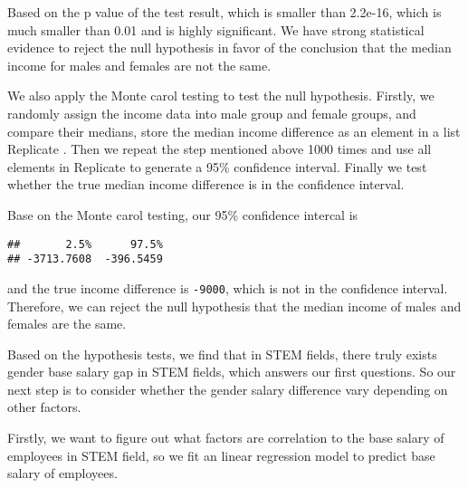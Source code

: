 \documentclass[
]{article}
\begin{document}
Based on the p value of the test result, which is smaller than 2.2e-16,
which is much smaller than 0.01 and is highly significant. We have
strong statistical evidence to reject the null hypothesis in favor of
the conclusion that the median income for males and females are not the
same.

We also apply the Monte carol testing to test the null hypothesis.
Firstly, we randomly assign the income data into male group and female
groups, and compare their medians, store the median income difference as
an element in a list Replicate . Then we repeat the step mentioned above
1000 times and use all elements in Replicate to generate a 95\%
confidence interval. Finally we test whether the true median income
difference is in the confidence interval.

Base on the Monte carol testing, our 95\% confidence intercal is

\begin{verbatim}
##       2.5%      97.5% 
## -3713.7608  -396.5459
\end{verbatim}

and the true income difference is \texttt{-9000}, which is not in the
confidence interval. Therefore, we can reject the null hypothesis that
the median income of males and females are the same.

Based on the hypothesis tests, we find that in STEM fields, there truly
exists gender base salary gap in STEM fields, which answers our first
questions. So our next step is to consider whether the gender salary
difference vary depending on other factors.

Firstly, we want to figure out what factors are correlation to the base
salary of employees in STEM field, so we fit an linear regression model
to predict base salary of employees.
\end{document}
